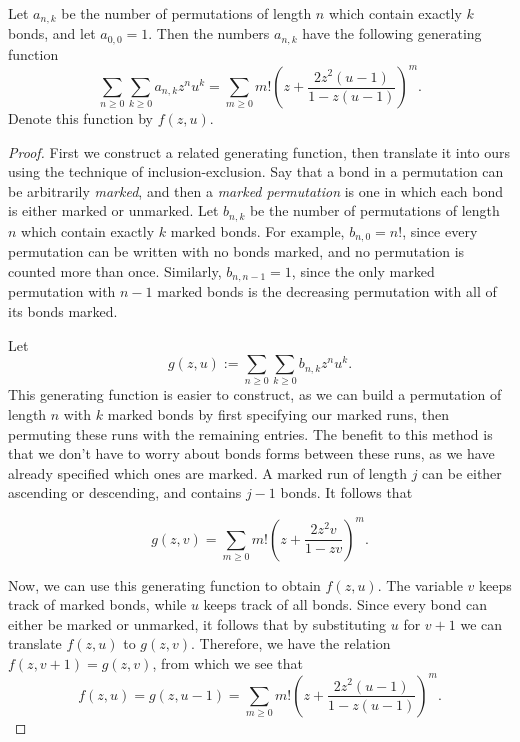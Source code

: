 \documentclass[12pt,twoside]{memoir}
\begin{document}
    \begin{theorem} \label{fixpat:thm:genfcn}
      Let $a_{n,k}$ be the number of permutations of length $n$ which contain
      exactly $k$ bonds, and let $a_{0,0} = 1$. Then the numbers $a_{n,k}$ have
      the following generating function
      $$ \sum_{n \geq 0} \sum_{k \geq 0} a_{n,k} z^n u^k = 
        \sum_{m \geq 0} m! \left(z + \frac{2z^2(u - 1)}{1 - z(u-1)}\right)^m.$$
      Denote this function by $f(z,u)$. 
    \end{theorem}
    \begin{proof}
      First we construct a related generating function, then translate it into
      ours using the technique of inclusion-exclusion. 
      Say that a bond in a permutation can be arbitrarily \emph{marked}, and then a  
      \emph{marked permutation} is one in which each bond is either marked or
      unmarked.  Let $b_{n,k}$ be the number of permutations of length $n$ which contain
      exactly $k$ marked bonds. For example, $b_{n,0} = n!$, since every
      permutation can be written with no bonds marked, and no permutation is
      counted more than once. Similarly, $b_{n,n-1} = 1$, since the only
      marked permutation with $n-1$ marked bonds is the decreasing permutation
      with all of its bonds marked. 

      Let 
      $$ g(z,u) := \sum_{n \geq 0}\sum_{k \geq 0} b_{n,k}z^n u^k. $$ 
      This generating
      function is easier to construct, as we can build a permutation of length $n$ with
      $k$ marked bonds by first specifying our marked runs, then permuting
      these runs with the remaining entries. The benefit to this method is that
      we don't have to worry about bonds forms between these runs, as we have
      already specified which ones are marked. A marked run of length $j$
      can be either ascending or descending, and contains $j-1$ bonds. 
      It follows that 

      $$ g(z,v) = \sum_{m \geq 0}
          m! \left(z + \frac{2z^2v}{1 - zv} \right)^m.$$

      Now, we can use this generating function to obtain $f(z,u)$. The variable
      $v$ keeps track of marked bonds, while $u$ keeps track of all bonds.
      Since every bond can either be marked or unmarked, it follows that by
      substituting $u$ for $v + 1$ we can translate $f(z,u)$ to $g(z,v)$.
      Therefore, we have the relation $f(z,v+1) = g(z,v)$, from which we see
      that 
      $$ f(z,u) = g(z,u-1) = 
        \sum_{m \geq 0} m! \left(z + \frac{2z^2(u-1)}{1 - z(u-1)} \right)^m.$$
    \end{proof}
\end{document}
